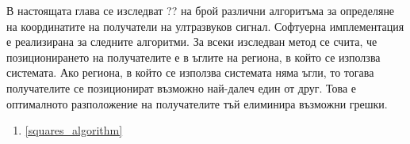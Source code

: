 В настоящата глава се изследват ?? на брой различни алгоритъма за определяне на координатите на получатели на ултразвуков сигнал. Софтуерна имплементация е реализирана за следните алгоритми. За всеки изследван метод се счита, че позиционирането на получателите е в ъглите на региона, в който се използва системата. Ако региона, в който се използва системата няма ъгли, то тогава получателите се позиционират възможно най-далеч един от друг. Това е оптималното разположение на получателите тъй елиминира възможни грешки.

\begin{enumerate}
    \item \ref{squares_algorithm}
\end{enumerate}



\pagebreak



\pagebreak



\pagebreak



\pagebreak



\pagebreak


\pagebreak


\pagebreak